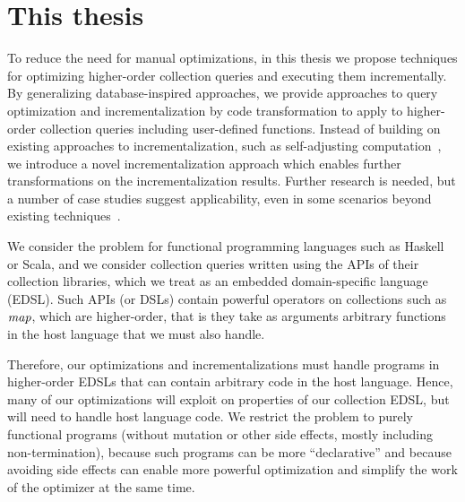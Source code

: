 \section{This thesis}
To reduce the need for manual optimizations, in this thesis we propose
techniques for optimizing higher-order collection queries and executing them
incrementally.
By generalizing database-inspired approaches, we provide approaches to query optimization and
incrementalization by code transformation to apply to higher-order collection
queries including user-defined functions.
Instead of building on existing approaches to incrementalization, such as
self-adjusting computation~\citep{Acar09}, we introduce a novel
incrementalization approach which enables further transformations on the
incrementalization results.
%
Further research is needed, but a number of case studies suggest
applicability, even in some scenarios beyond existing
techniques~\citep{Koch2016incremental}.

We consider the problem for functional programming languages such as Haskell or
Scala, and we consider collection queries written using the APIs of their
collection libraries, which we treat as an embedded domain-specific language (EDSL). Such
APIs (or DSLs) contain powerful operators on collections such as $\mathit{map}$,
which are higher-order, that
is they take as arguments arbitrary functions in the host language that we must
also handle.

Therefore, our optimizations and incrementalizations must handle programs in
higher-order EDSLs that can contain arbitrary code in the host language. Hence,
many of our optimizations will exploit on properties of our collection EDSL, but
will need to handle host language code. We restrict the problem to purely
functional programs (without mutation or other side effects, mostly including
non-termination), because such programs can be more ``declarative'' and because
avoiding side effects can enable more powerful optimization and simplify the
work of the optimizer at the same time.

